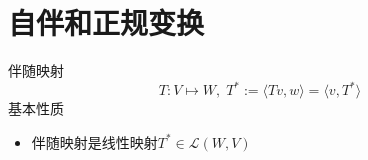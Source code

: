 \documentclass{tufte-book}
\begin{document}
\section{自伴和正规变换}
伴随映射
\[T:V\mapsto W,\;T^\ast := \langle Tv,w\rangle = \langle v, T^\ast\rangle \]
基本性质
\begin{itemize}
    \item 伴随映射是线性映射\(T^\ast \in \mathcal{L}(W,V)\)
\end{itemize}
\backmatter
\printindex
\end{document}
